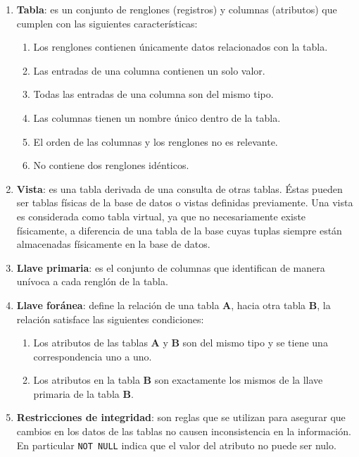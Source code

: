 \begin{enumerate}
	\item \textbf{Tabla}: es un conjunto de renglones (registros) y columnas (atributos) que cumplen con las siguientes características\cite{DataBaseConcepts}:
	\begin{enumerate}
		\item Los renglones contienen únicamente datos relacionados con la tabla.
		\item Las entradas de una columna contienen un solo valor.
		\item Todas las entradas de una columna son del mismo tipo.
		\item Las columnas tienen un nombre único dentro de la tabla.
		\item El orden de las columnas y los renglones no es relevante.
		\item No contiene dos renglones idénticos.
	\end{enumerate}
	\item \textbf{Vista}: es una tabla derivada de una consulta de otras tablas. Éstas pueden ser tablas físicas de la base de datos o vistas definidas previamente. Una vista es considerada como tabla virtual, ya que no necesariamente existe físicamente, a diferencia de una tabla de la base cuyas tuplas siempre están almacenadas físicamente en la base de datos\cite{FundamentalsOfDBSystems}.
	\item \textbf{Llave primaria}: es el conjunto de columnas que identifican de manera unívoca a cada renglón de la tabla.\cite{DataBaseConcepts}
	\item \textbf{Llave foránea}: define la relación de una tabla \textbf{A}, hacia otra tabla \textbf{B}, la relación satisface las siguientes condiciones\cite{FundamentalsOfDBSystems, DataBaseConcepts}:
	\begin{enumerate}
		\item Los atributos de las tablas \textbf{A} y \textbf{B} son del mismo tipo y se tiene una correspondencia uno a uno.
		\item Los atributos en la tabla \textbf{B} son exactamente los mismos de la llave primaria de la tabla \textbf{B}.
	\end{enumerate}
	\item \textbf{Restricciones de integridad}: son reglas que se utilizan para asegurar que cambios en los datos de las tablas no causen inconsistencia en la información\cite{DatabaseSystemConcepts}. En particular \texttt{NOT NULL} indica que el valor del atributo no puede ser nulo\cite{FundamentosSistemasBasesDatos}.

\end{enumerate}
